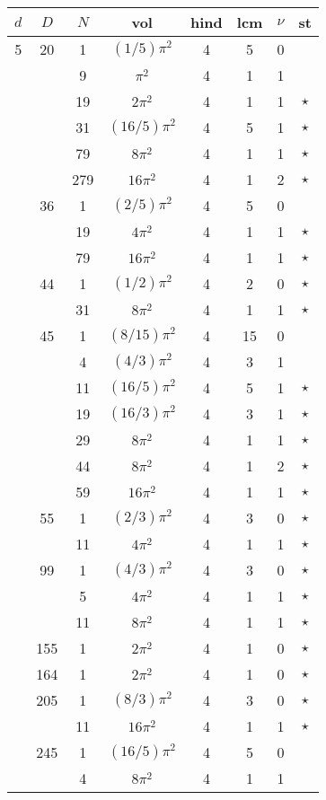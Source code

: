 \documentclass[12pt]{amsart}
\begin{document}
\begin{tabular}{ccc|ccccc}
$d$ & $D$ & $N$ & vol & hind & lcm & $\nu$ & st\\
\hline
5 & 20 & 1 & $(1/5)\pi^2$ & 4 & 5 & 0 &  \\
 &  & 9 & $\pi^2$ & 4 & 1 & 1 &  \\
 &  & 19 & $2\pi^2$ & 4 & 1 & 1 & $\star$ \\
 &  & 31 & $(16/5)\pi^2$ & 4 & 5 & 1 & $\star$ \\
 &  & 79 & $8\pi^2$ & 4 & 1 & 1 & $\star$ \\
 &  & 279 & $16\pi^2$ & 4 & 1 & 2 & $\star$ \\
 & 36 & 1 & $(2/5)\pi^2$ & 4 & 5 & 0 &  \\
 &  & 19 & $4\pi^2$ & 4 & 1 & 1 & $\star$ \\
 &  & 79 & $16\pi^2$ & 4 & 1 & 1 & $\star$ \\
 & 44 & 1 & $(1/2)\pi^2$ & 4 & 2 & 0 & $\star$ \\
 &  & 31 & $8\pi^2$ & 4 & 1 & 1 & $\star$ \\
 & 45 & 1 & $(8/15)\pi^2$ & 4 & 15 & 0 &  \\
 &  & 4 & $(4/3)\pi^2$ & 4 & 3 & 1 &  \\
 &  & 11 & $(16/5)\pi^2$ & 4 & 5 & 1 & $\star$ \\
 &  & 19 & $(16/3)\pi^2$ & 4 & 3 & 1 & $\star$ \\
 &  & 29 & $8\pi^2$ & 4 & 1 & 1 & $\star$ \\
 &  & 44 & $8\pi^2$ & 4 & 1 & 2 & $\star$ \\
 &  & 59 & $16\pi^2$ & 4 & 1 & 1 & $\star$ \\
 & 55 & 1 & $(2/3)\pi^2$ & 4 & 3 & 0 & $\star$ \\
 &  & 11 & $4\pi^2$ & 4 & 1 & 1 & $\star$ \\
 & 99 & 1 & $(4/3)\pi^2$ & 4 & 3 & 0 & $\star$ \\
 &  & 5 & $4\pi^2$ & 4 & 1 & 1 & $\star$ \\
 &  & 11 & $8\pi^2$ & 4 & 1 & 1 & $\star$ \\
 & 155 & 1 & $2\pi^2$ & 4 & 1 & 0 & $\star$ \\
 & 164 & 1 & $2\pi^2$ & 4 & 1 & 0 & $\star$ \\
 & 205 & 1 & $(8/3)\pi^2$ & 4 & 3 & 0 & $\star$ \\
 &  & 11 & $16\pi^2$ & 4 & 1 & 1 & $\star$ \\
 & 245 & 1 & $(16/5)\pi^2$ & 4 & 5 & 0 &  \\
 &  & 4 & $8\pi^2$ & 4 & 1 & 1 &  \\

\end{tabular}
\end{document}
